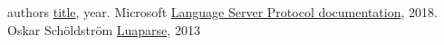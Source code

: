  authors \href{link}{title}, year.
 Microsoft \href{https://microsoft.github.io/language-server-protocol/specification#initialize}{Language Server Protocol documentation}, 2018.
 Oskar Schöldström \href{https://oxyc.github.io/luaparse/}{Luaparse}, 2013
